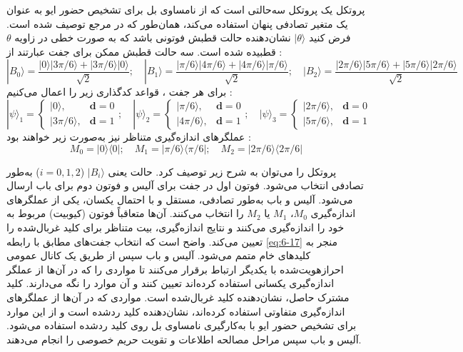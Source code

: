 پروتکل  یک پروتکل سه‌حالتی است که از نامساوی بل برای تشخیص حضور ایو به عنوان یک متغیر تصادفی پنهان استفاده می‌کند، همان‌طور که در مرجع \cite{40} توصیف شده است. فرض کنید $|\theta\rangle$ نشان‌دهنده حالت قطبش فوتونی باشد که به صورت خطی در زاویه $\theta$ قطبیده شده است. سه حالت قطبش ممکن برای جفت  عبارتند از \cite{40}:
\begin{equation}
	|B_0\rangle = \frac{|0\rangle|3\pi/6\rangle + |3\pi/6\rangle|0\rangle}{\sqrt{2}}; \quad |B_1\rangle = \frac{|\pi/6\rangle|4\pi/6\rangle + |4\pi/6\rangle|\pi/6\rangle}{\sqrt{2}}; \quad |B_2\rangle = \frac{|2\pi/6\rangle|5\pi/6\rangle + |5\pi/6\rangle|2\pi/6\rangle}{\sqrt{2}}
	\label{eq:6-17}
\end{equation}
برای هر جفت ، قواعد کدگذاری زیر را اعمال می‌کنیم \cite{40}:
\begin{equation}
	|\psi\rangle_1 = \begin{cases} |0\rangle, & \bm{d} = 0 \\ |3\pi/6\rangle, & \bm{d} = 1 \end{cases}; \quad |\psi\rangle_2 = \begin{cases} |\pi/6\rangle, & \bm{d} = 0 \\ |4\pi/6\rangle, & \bm{d} = 1 \end{cases}; \quad |\psi\rangle_3 = \begin{cases} |2\pi/6\rangle, & \bm{d} = 0 \\ |5\pi/6\rangle, & \bm{d} = 1 \end{cases}
	\label{eq:6-18}
\end{equation}
عملگرهای اندازه‌گیری متناظر نیز به‌صورت زیر خواهند بود \cite{40}:
\begin{equation}
	M_0 = |0\rangle\langle 0|; \quad M_1 = |\pi/6\rangle\langle \pi/6|; \quad M_2 = |2\pi/6\rangle\langle 2\pi/6|
	\label{eq:6-19}
\end{equation}

پروتکل  را می‌توان به شرح زیر توصیف کرد. حالت  یعنی $|B_i\rangle$ ($i = 0, 1, 2$) به‌طور تصادفی انتخاب می‌شود. فوتون اول در جفت  برای آلیس و فوتون دوم برای باب ارسال می‌شود. آلیس و باب به‌طور تصادفی، مستقل و با احتمال یکسان، یکی از عملگرهای اندازه‌گیری $M_0$، $M_1$ یا $M_2$ را انتخاب می‌کنند. آن‌ها متعاقباً فوتون (کیوبیت) مربوط به خود را اندازه‌گیری می‌کنند و نتایج اندازه‌گیری، بیت متناظر برای کلید غربال‌شده را تعیین می‌کند. واضح است که انتخاب جفت‌های  مطابق با رابطه \eqref{eq:6-17} منجر به کلیدهای خام متمم می‌شود. آلیس و باب سپس از طریق یک کانال عمومی احرازهویت‌شده با یکدیگر ارتباط برقرار می‌کنند تا مواردی را که در آن‌ها از عملگر اندازه‌گیری یکسانی استفاده کرده‌اند تعیین کنند و آن موارد را نگه می‌دارند. کلید مشترک حاصل، نشان‌دهنده کلید غربال‌شده است. مواردی که در آن‌ها از عملگرهای اندازه‌گیری متفاوتی استفاده کرده‌اند، نشان‌دهنده کلید ردشده است و از این موارد برای تشخیص حضور ایو با به‌کارگیری نامساوی بل روی کلید ردشده استفاده می‌شود. آلیس و باب سپس مراحل مصالحه اطلاعات و تقویت حریم خصوصی را انجام می‌دهند.

